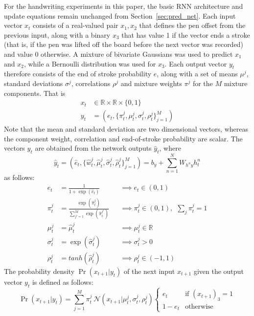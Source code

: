 \documentclass{article}
\newcommand{\sref}[1]{Section~\ref{sec:#1}}
\newcommand{\reals}{\mathbb{R}}
\newcommand{\expo}[1]{\exp\left(#1\right)}
\newcommand{\gauss}{\mathcal{N}}
\begin{document}
For the handwriting experiments in this paper, the basic RNN architecture and update equations remain unchanged from \sref{pred_net}. 
Each input vector $x_t$ consists of a real-valued pair $x_1,x_2$ that defines the pen offset from the previous input, along with a binary $x_3$ that has value 1 if the vector ends a stroke (that is, if the pen was lifted off the board before the next vector was recorded) and value 0 otherwise.
A mixture of bivariate Gaussians was used to predict $x_1$ and $x_2$, while a Bernoulli distribution was used for $x_3$.
Each output vector $y_t$ therefore consists of the end of stroke probability $e$, along with a set of means $\mu^j$, standard deviations $\sigma^j$, correlations $\rho^j$ and mixture weights $\pi^j$ for the $M$ mixture components.
That is
\begin{align}
x_t &\in \reals \times \reals \times \{0,1\}\\
y_t &= \left(e_t,\{\pi_t^j,\mu_t^j,\sigma_t^j,\rho_t^j\}_{j=1}^M\right)
\end{align} 
Note that the mean and standard deviation are two dimensional vectors, whereas the component weight, correlation and end-of-stroke probability are scalar.
The vectors $y_t$ are obtained from the network outputs $\hat{y}_t$, where
\begin{equation}
\label{eq:handwriting_out}
\hat{y}_t = \left(\hat{e}_t,\{\hat{w}_t^j,\hat{\mu}_t^j,\hat{\sigma}_t^j,\hat{\rho}_t^j\}_{j=1}^M\right) = b_y + \sum_{n=1}^N W_{h^n y}h^n_t
\end{equation}
as follows:
\begin{align}
\label{eq:eos}
e_t &= \frac{1}{1+\expo{\hat{e}_t}} &&\implies e_t \in (0,1)\\
\label{eq:mix_wt}
\pi_t^j &= \frac{\expo{\hat{\pi}_t^j}}{\sum_{{j'}=1}^M{\expo{\hat{\pi}_t^{j'}}}} &&\implies \pi_t^j \in (0,1),\ \ \sum_j{\pi_t^j} = 1\\
\label{eq:mean}
\mu_t^j &= \hat{\mu}_t^j &&\implies \mu_t^j \in \reals\\
\label{eq:dev}
\sigma_t^j &= \expo{\hat{\sigma}_t^j} &&\implies \sigma_t^j > 0\\
\label{eq:corr}
\rho_t^j &= tanh(\hat{\rho}_t^j) &&\implies \rho_t^j \in (-1,1)
\end{align}
The probability density $\Pr(x_{t+1}|y_t)$ of the next input $x_{t+1}$ given the output vector $y_t$ is defined as follows:
\begin{equation}
\Pr(x_{t+1}|y_t) = \sum_{j=1}^M{\pi_t^j\ \gauss(x_{t+1}|\mu_t^j, \sigma_t^j, \rho_t^j )}\begin{cases}e_t  &\text{if } (x_{t+1})_3 = 1\\1-e_t &\text{otherwise}\end{cases}
\end{equation}
\end{document}
